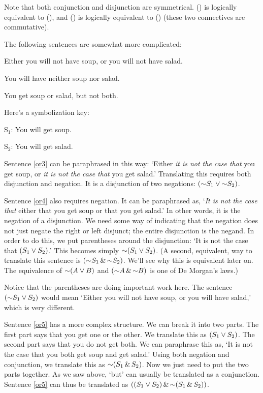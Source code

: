 Note that both conjunction and disjunction are symmetrical. (\metaA{}\eand\metaB{}) is logically equivalent to (\metaB{}\eand\metaA{}), and (\metaA{}\eor\metaB{}) is logically equivalent to (\metaB{}\eor\metaA{}) (these two connectives are commutative).

The following sentences are somewhat more complicated:

\begin{earg}
\item[\ex{or3}] Either you will not have soup, or you will not have salad.
\item[\ex{or4}] You will have neither soup nor salad.
\item[\ex{or5}] You get soup or salad, but not both.
\end{earg}

Here's a symbolization key:

\begin{ekey}
\item[S$_1$:] You will get soup.
\item[S$_2$:] You will get salad.
\end{ekey}

Sentence \ref{or3} can be paraphrased in this way: `Either \emph{it is not the case that} you get soup, or \emph{it is not the case that} you get salad.' Translating this requires both disjunction and negation. It is a disjunction of two negations: $(\enot S_1 \eor \enot S_2)$.

Sentence \ref{or4} also requires negation. It can be paraphrased as, `\emph{It is not the case that} either that you get soup or that you get salad.' In other words, it is the negation of a disjunction. We need some way of indicating that the negation does not just negate the right or left disjunct; the entire disjunction is the negand. In order to do this, we put parentheses around the disjunction: `It is not the case that $(S_1 \vee S_2)$.' This becomes simply $\enot (S_1 \eor S_2)$. (A second, equivalent, way to translate this sentence is $(\enot S_1 \eand \enot S_2)$. We'll see why this is equivalent later on. The equivalence of $\enot (A \eor B)$ and $(\enot A \eand \enot B)$ is one of De Morgan's laws.)

Notice that the parentheses are doing important work here. The sentence $(\enot S_1 \eor S_2)$ would mean `Either you will not have soup, or you will have salad,' which is very different.

Sentence \ref{or5} has a more complex structure. We can break it into two parts. The first part says that you get one or the other. We translate this as $(S_1 \vee S_2)$. The second part says that you do not get both. We can paraphrase this as, `It is not the case that you both get soup and get salad.' Using both negation and conjunction, we translate this as $\enot(S_1 \eand S_2)$. Now we just need to put the two parts together. As we saw above, `but' can usually be translated as a conjunction. Sentence \ref{or5} can thus be translated as $((S_1 \eor S_2) \eand \enot(S_1 \eand S_2))$.


